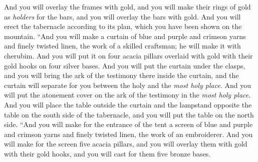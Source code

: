 \begin{biblechapter}
\verse And you will overlay the frames with gold, and you will make their rings of gold as \textit{holders} for the bars, and you will overlay the bars with gold.
\verse And you will erect the tabernacle according to its plan, which you have been shown on the mountain.
\verse “And you will make a curtain of blue and purple and crimson yarns and finely twisted linen, the work of a skilled craftsman; he will make it with cherubim.
\verse And you will put it on four acacia pillars overlaid with gold with their gold hooks on four silver bases.
\verse And you will put the curtain under the clasps, and you will bring the ark of the testimony there inside the curtain, and the curtain will separate for you between the holy and the \textit{most holy place}.
\verse And you will put the atonement cover on the ark of the testimony in the \textit{most holy place}.
\verse And you will place the table outside the curtain and the lampstand opposite the table on the south side of the tabernacle, and you will put the table on the north side.
\verse “And you will make for the entrance of the tent a screen of blue and purple and crimson yarns and finely twisted linen, the work of an embroiderer.
\verse And you will make for the screen five acacia pillars, and you will overlay them with gold with their gold hooks, and you will cast for them five bronze bases.
\end{biblechapter}

